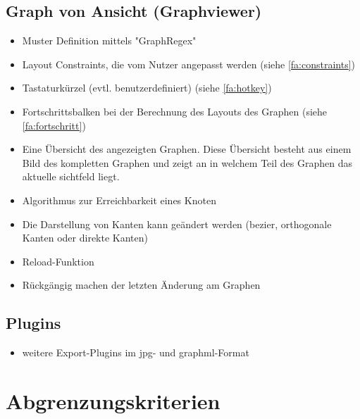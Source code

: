 \subsection{Graph von Ansicht (Graphviewer)}
  \begin{itemize}
    \item Muster Definition mittels "GraphRegex" %
    \item Layout Constraints, die vom Nutzer angepasst werden (siehe \ref{fa:constraints}) %
    \item Tastaturkürzel (evtl. benutzerdefiniert) (siehe \ref{fa:hotkey})
    \item Fortschrittsbalken bei der Berechnung des Layouts des Graphen (siehe \ref{fa:fortschritt})
    \item Eine Übersicht des angezeigten Graphen. Diese Übersicht besteht aus einem Bild des kompletten Graphen und zeigt an in welchem Teil des Graphen das aktuelle \gls{sichtfeld} liegt.  %
    \item Algorithmus zur Erreichbarkeit eines Knoten %
    \item Die Darstellung von Kanten kann geändert werden (\gls{bezier}, orthogonale Kanten oder direkte Kanten) %
    \item Reload-Funktion  %
    \item Rückgängig machen der letzten Änderung am Graphen %
  \end{itemize}

\subsection{Plugins}
  \begin{itemize}
    \item weitere Export-Plugins im \gls{jpg}- und \gls{graphml}-Format %
  \end{itemize}
  
\section{Abgrenzungskriterien}

